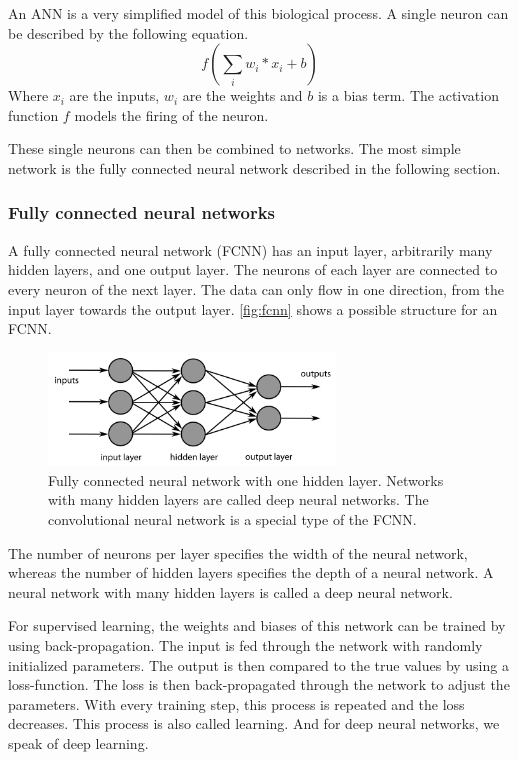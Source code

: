 \documentclass[12pt]{article}
\begin{document}
An ANN is a very simplified model of this biological process. A single neuron can be described by the following equation. $$f\left(\sum_{i}w_i*x_i+b\right)$$ Where $x_i$ are the inputs, $w_i$ are the weights and $b$ is a bias term. The activation function $f$ models the firing of the neuron.

These single neurons can then be combined to networks. The most simple network is the fully connected neural network described in the following section.

\subsubsection{Fully connected neural networks}
\label{subsubsec:fcnn}
A fully connected neural network (FCNN) has an input layer, arbitrarily many hidden layers, and one output layer. The neurons of each layer are connected to every neuron of the next layer. The data  can only flow in one direction, from the input layer towards the output layer. \autoref{fig:fcnn} shows a possible structure for an FCNN.

\begin{figure}[ht]
\includegraphics[width=3in]{ffnn}	
\caption{Fully connected neural network with one hidden layer. Networks with many hidden layers are called deep neural networks. The convolutional neural network is a special type of the FCNN.}
\label{fig:fcnn}
\end{figure}

The number of neurons per layer specifies the width of the neural network, whereas the number of hidden layers specifies the depth of a neural network. A neural network with many hidden layers is called a deep neural network.

For supervised learning, the weights and biases of this network can be trained by using back-propagation. The input is fed through the network with randomly initialized parameters. The output is then compared to the true values by using a loss-function. The loss is then back-propagated through the network to adjust the parameters. With every training step, this process is repeated and the loss decreases. This process is also called learning. And for deep neural networks, we speak of deep learning.
\end{document}
